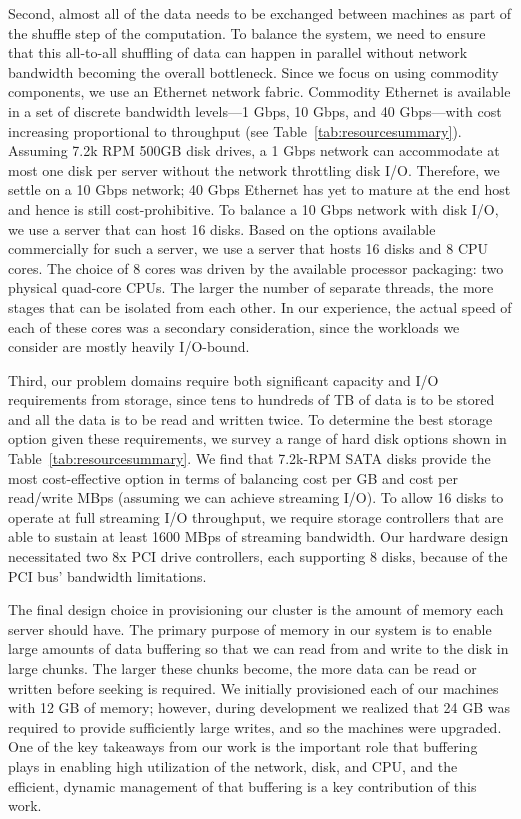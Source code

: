 Second, almost all of the data needs to be exchanged between machines as part
of the shuffle step of the computation.  To balance the system, we need to
ensure that this all-to-all shuffling of data can happen in parallel without
network bandwidth becoming the overall bottleneck.  Since we focus on using
commodity components, we use an Ethernet network fabric.  Commodity Ethernet is
available in a set of discrete bandwidth levels---1 Gbps, 10 Gbps, and 40
Gbps---with cost increasing proportional to throughput (see
Table~\ref{tab:resourcesummary}).  Assuming 7.2k RPM 500GB disk drives, a 1
Gbps network can accommodate at most one disk per server without the network
throttling disk I/O.  Therefore, we settle on a 10 Gbps network; 40 Gbps
Ethernet has yet to mature at the end host and hence is still cost-prohibitive.
To balance a 10 Gbps network with disk I/O, we use a server that can host 16
disks.  Based on the options available commercially for such a server, we use a
server that hosts 16 disks and 8 CPU cores.  The choice of 8 cores was driven
by the available processor packaging: two physical quad-core CPUs.  The larger
the number of separate threads, the more stages that can be isolated from each
other.  In our experience, the actual speed of each of these cores was a
secondary consideration, since the workloads we consider are mostly heavily
I/O-bound.

Third, our problem domains require both significant capacity and I/O
requirements from storage, since tens to hundreds of TB of data is to be stored
and all the data is to be read and written twice.  To determine the best
storage option given these requirements, we survey a range of hard disk options
shown in Table~\ref{tab:resourcesummary}.  We find that 7.2k-RPM SATA disks
provide the most cost-effective option in terms of balancing cost per GB and
cost per read/write MBps (assuming we can achieve streaming I/O).  To allow 16
disks to operate at full streaming I/O throughput, we require storage
controllers that are able to sustain at least 1600 MBps of streaming bandwidth.
Our hardware design necessitated two 8x PCI drive controllers, each supporting
8 disks, because of the PCI bus' bandwidth limitations.

The final design choice in provisioning our cluster is the amount of memory
each server should have.  The primary purpose of memory in our system is to
enable large amounts of data buffering so that we can read from and write to
the disk in large chunks.  The larger these chunks become, the more data can be
read or written before seeking is required.  We initially provisioned each of
our machines with 12 GB of memory; however, during development we realized that
24 GB was required to provide sufficiently large writes, and so the machines
were upgraded.  One of the key takeaways from our work is the important role
that buffering plays in enabling high utilization of the network, disk, and
CPU, and the efficient, dynamic management of that buffering is a key
contribution of this work.

